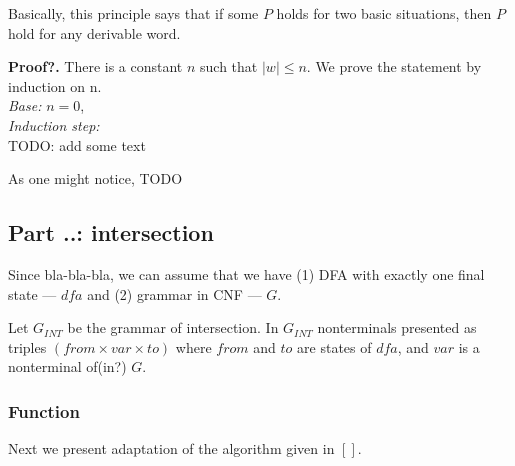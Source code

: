 Basically, this principle says that if some $P$ holds for two basic situations, then $P$ hold for any derivable word.

\textbf{Proof?.} 
There is a constant $n$ such that $| w | \le n$. 
We prove the statement by induction on n. \\
\textit{Base:} $n = 0$, \\
\textit{Induction step: } \\








TODO: add some text

As one might notice, TODO




\subsection{Part ..: intersection}

Since bla-bla-bla, we can assume that we have (1) DFA with exactly one final state --- $dfa$ and (2) grammar in CNF --- $G$. 

Let $G_{INT}$ be the grammar of intersection. In $G_{INT}$ nonterminals presented as triples $(from \times var \times to) $ where $from$ and $to$ are states of $dfa$, and $var$ is a nonterminal of(in?) $G$.

\subsubsection{Function }
Next we present adaptation of the algorithm given in $[ ]$. 

